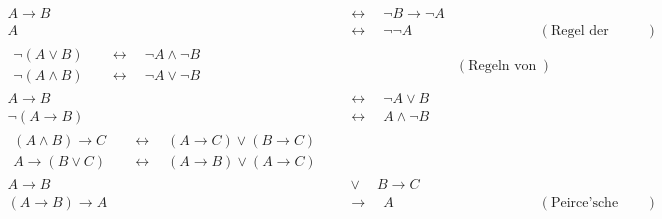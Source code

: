 \begin{align*}
    A \to B & \quad \leftrightarrow\quad \neg B \to \neg A \\
    A & \quad\leftrightarrow\quad \neg\neg A && (\text{Regel der doppelten Verneinung}) \\[1em]
    \begin{split}
        \neg (A \lor B) & \quad\leftrightarrow\quad \neg A \land \neg B\\
        \neg(A \land B) & \quad\leftrightarrow\quad \neg A \lor \neg B  %
    \end{split} && (\text{Regeln von De Morgan}) \\[1em]
    A\to B & \quad\leftrightarrow\quad  \neg A \lor B \\
    \neg (A\to B) & \quad\leftrightarrow\quad  A \land \neg B \\[1em]
    \begin{split}
        (A\land B) \to C & \quad\leftrightarrow\quad (A\to C) \lor (B\to C) \\ %
        A \to (B\lor C) & \quad\leftrightarrow\quad (A\to B) \lor (A\to C) %
    \end{split} \\[1em]
    A\to B & \quad \lor\quad B\to C \\
    (A\to B)\to A &\quad \to\quad A && (\text{Peirce’sche Regel})
\end{align*}
\endgroup

 
 
 
 
